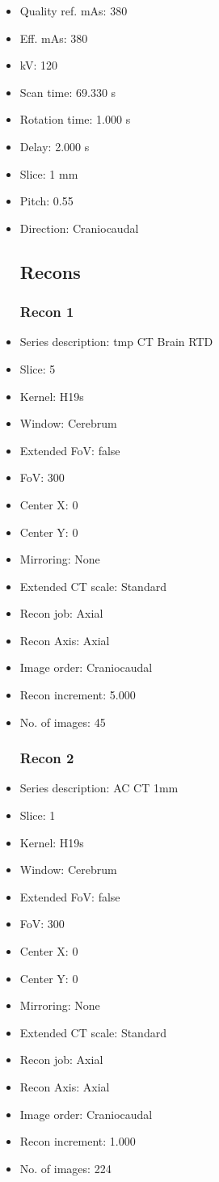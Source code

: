 \documentclass[12pt]{article}
\begin{document}
\begin{itemize}
\subsection{Scan}
\item Quality ref. mAs: 380\item Eff. mAs: 380\item kV: 120\item Scan time: 69.330 s\item Rotation time: 1.000 s\item Delay: 2.000 s\item Slice: 1 mm\item Pitch: 0.55\item Direction: Craniocaudal\subsection{Recons}

\subsubsection{Recon 1}
\item Series description: tmp CT Brain RTD
\item Slice: 5
\item Kernel: H19s
\item Window: Cerebrum
\item Extended FoV: false
\item FoV: 300
\item Center X: 0
\item Center Y: 0
\item Mirroring: None
\item Extended CT scale: Standard
\item Recon job: Axial
\item Recon Axis: Axial
\item Image order: Craniocaudal
\item Recon increment: 5.000
\item No. of images: 45
\subsubsection{Recon 2}
\item Series description: AC CT 1mm
\item Slice: 1
\item Kernel: H19s
\item Window: Cerebrum
\item Extended FoV: false
\item FoV: 300
\item Center X: 0
\item Center Y: 0
\item Mirroring: None
\item Extended CT scale: Standard
\item Recon job: Axial
\item Recon Axis: Axial
\item Image order: Craniocaudal
\item Recon increment: 1.000
\item No. of images: 224

\end{itemize}
\end{document}
